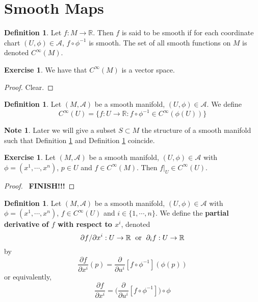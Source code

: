 \documentclass{book}
\theoremstyle{definition}
\newtheorem{defn}[definition]{Definition}
\newtheorem{note}[definition]{Note}
\newtheorem{ex}[definition]{Exercise}
\newcommand{\R}{\mathbb{R}}
\newcommand{\MA}{\mathcal{A}}
\newcommand{\ld}[1]{\label{defn:#1}}
\newcommand{\rd}[1]{Definition \ref{defn:#1}}
\DeclareMathOperator*{\0}{\mbf{0}}
\DeclareMathOperator*{\1}{\mbf{1}}
\newcommand{\p}{\partial}
\begin{document}
	
	
	
	
	
	
	
	
	
	
	
	
	
	
	
	\newpage 
	\section{Smooth Maps}	
	
	\begin{defn} \ld{42001}
		Let $f: M \rightarrow \R$. Then $f$ is said to be smooth if for each coordinate chart $(U, \phi) \in \MA$, $f \circ \phi^{-1}$ is smooth. The set of all smooth functions on $M$ is denoted $C^{\infty}(M)$. 
	\end{defn}

	\begin{ex} \ld{42002}
		We have that $C^{\infty}(M)$ is a vector space.
	\end{ex}

	\begin{proof}
		Clear.
	\end{proof}
	
	\begin{defn} \ld{42003}
	Let $(M, \MA)$ be a smooth manifold, $(U, \phi) \in \MA$. We define $$C^{\infty}(U) = \{f:U \rightarrow \R: f \circ \phi^{-1} \in C^{\infty}(\phi(U))\}$$
	\end{defn}
	
	\begin{note}
	Later we will give a subset $S \subset M$ the structure of a smooth manifold such that \rd{42001} and \rd{42003} coincide.
	\end{note}
	
	\begin{ex}
	Let $(M, \MA)$ be a smooth manifold, $(U, \phi) \in \MA$ with $\phi = (x^1, \cdots, x^n)$, $p \in U$ and $f \in C^{\infty}(M)$. Then $f|_U \in C^{\infty}(U)$.
	\end{ex}
	
	\begin{proof}\
	\textbf{FINISH!!!}
	\end{proof}
	
	\begin{defn}
	Let $(M, \MA)$ be a smooth manifold, $(U, \phi) \in \MA$ with $\phi = (x^1, \cdots, x^n)$, $f \in C^{\infty}(U)$ and $i \in \{1, \cdots, n\}$. We define the \textbf{partial derivative of $f$ with respect to $x^i$}, denoted $$ \p f / \p x^i: U \rightarrow \R \hspace{.1cm} \text{ or } \hspace{.1cm} \p_{i} f: U \rightarrow \R$$ by 
	\begin{equation*}
	\frac{\p f}{\p x^i}(p) = {\frac{\p}{\p u^i}[f \circ \phi^{-1}] }( \phi(p)) 
	\end{equation*}
	or equivalently,
	\begin{equation*}
	\frac{\p f}{\p x^i} = \bigg({\frac{\p}{\p u^i}[f \circ \phi^{-1}] \bigg) \circ \phi }
	\end{equation*}
	\end{defn}
	
\end{document}
